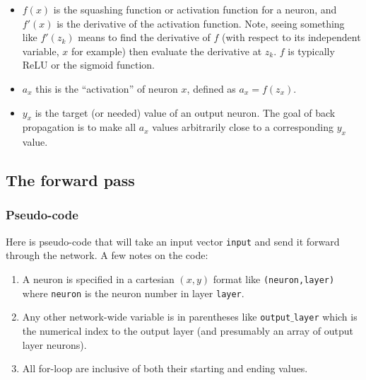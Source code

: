 \documentclass[12pt]{article}
\begin{document}
\begin{itemize}
\item $f(x)$ is the squashing function or activation function for a neuron, and $f'(x)$ is the derivative of the activation function.  Note, seeing something like $f'(z_k)$ means to find the derivative of $f$ (with respect to its independent variable, $x$ for example) then evaluate the derivative at $z_k$.  $f$ is typically ReLU or the sigmoid function.

\item $a_x$ this is the ``activation'' of neuron $x$, defined as $a_x=f(z_x)$.

\item $y_x$ is the target (or needed) value of an output neuron.  The goal of back propagation is to make all $a_x$ values arbitrarily close to a corresponding $y_x$ value.

\end{itemize}

\subsection{The forward pass}

\subsubsection{Pseudo-code}

Here is pseudo-code that will take an input vector {\tt input} and send it forward through the network.  A few notes on the code:

\begin{enumerate}

\item A neuron is specified in a cartesian $(x,y)$ format like {\tt (neuron,layer)} where {\tt neuron} is the neuron number in layer {\tt layer}.  
\item Any other network-wide variable is in parentheses like {\tt output$\_$layer} which is the numerical index to the output layer (and presumably an array of output layer neurons).
\item All for-loop are inclusive of both their starting and ending values.

\end{enumerate}
\end{document}
